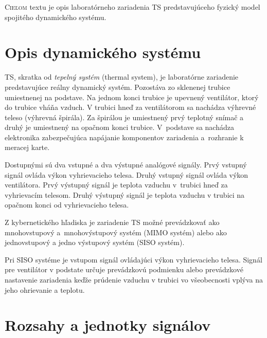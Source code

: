 \documentclass[a4paper, 10pt, ]{article}
\begin{document}
\bigskip

\normalsize
\normalfont

\lstset{style=mystyle}










\noindent
\lettrine[lines=1, nindent=1pt, loversize=0.0]{C}{ieľom} 
textu je opis laboratórneho zariadenia TS predstavujúceho fyzický model spojitého dynamického systému.


\section{Opis dynamického systému}

TS, skratka od \emph{tepelný systém} (thermal system), je laboratórne zariadenie predstavujúce reálny dynamický systém. Pozostáva zo sklenenej trubice umiestnenej na podstave. Na jednom konci trubice je upevnený ventilátor, ktorý do trubice vháňa vzduch. V trubici hneď za ventilátorom sa nachádza výhrevné teleso (výhrevná špirála). Za špirálou je umiestnený prvý teplotný snímač a druhý je umiestnený na opačnom konci trubice. V~podstave sa nachádza elektronika zabezpečujúca napájanie komponentov zariadenia a~rozhranie k meracej karte.

Dostupnými sú dva vstupné a dva výstupné analógové signály. Prvý vstupný signál ovláda výkon vyhrievacieho telesa. Druhý vstupný signál ovláda výkon ventilátora. Prvý výstupný signál je teplota vzduchu v~trubici hneď za vyhrievacím telesom. Druhý výstupný signál je teplota vzduchu v trubici na opačnom konci od vyhrievacieho telesa.

Z kybernetického hľadiska je zariadenie TS možné prevádzkovať ako mnohovstupový a~mnohovýstupový systém (MIMO systém) alebo ako jednovstupový a jedno výstupový systém (SISO systém). 

Pri SISO systéme je vstupom signál ovládajúci výkon vyhrievacieho telesa. Signál pre ventilátor v podstate určuje prevádzkovú podmienku alebo prevádzkové nastavenie zariadenia keďže prúdenie vzduchu v trubici vo všeobecnosti vplýva na jeho ohrievanie a teplotu.





\section{Rozsahy a jednotky signálov}
\end{document}
